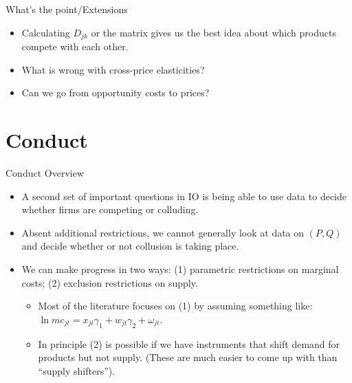 \documentclass[xcolor=pdftex,dvipsnames,table,mathserif,aspectratio=169]{beamer}
\begin{document}
\begin{frame}{What's the point/Extensions}
\begin{itemize}
\item Calculating $D_{jk}$ or the matrix gives us the best idea about which products compete with each other.
\item What is wrong with cross-price elasticities?
\item Can we go from opportunity costs to prices?
\end{itemize}
\end{frame}



\section{Conduct}

\begin{frame}{Conduct Overview}
\begin{itemize}
\item A second set of important questions in IO is being able to use data to decide whether firms are \alert{competing} or \alert{colluding}.
\item Absent additional restrictions, we cannot generally look at data on $(P,Q)$ and decide whether or not collusion is taking place.
\item We can make progress in two ways: (1) parametric restrictions on marginal costs; (2) exclusion restrictions on supply.
\begin{itemize}
\item Most of the literature focuses on (1) by assuming something like: $\ln mc_{jt} = x_{jt} \gamma_1 + w_{jt} \gamma_2 + \omega_{jt}$.
\item In principle (2) is possible if we have instruments that shift demand for products but not supply. (These are much easier to come up with than ``supply shifters'').
\end{itemize}
\end{itemize}
\end{frame}
\end{document}

